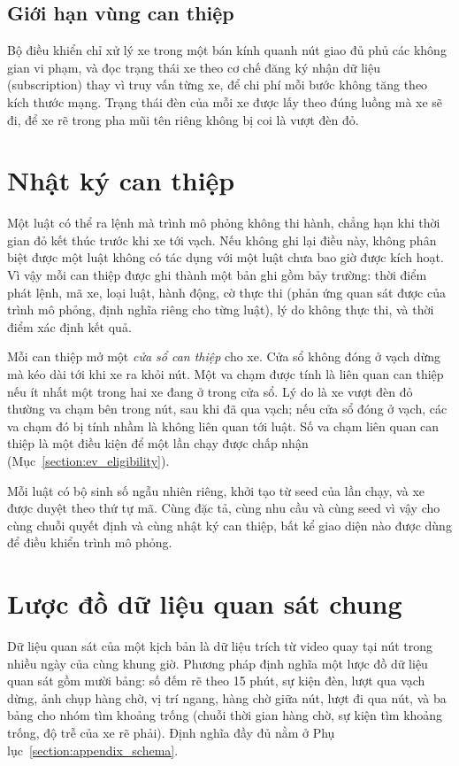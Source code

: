 \documentclass[../main.tex]{subfiles}
\begin{document}
\subsection{Giới hạn vùng can thiệp}

Bộ điều khiển chỉ xử lý xe trong một bán kính quanh nút giao đủ phủ các không gian vi phạm, và đọc trạng thái xe theo cơ chế đăng ký nhận dữ liệu (subscription) thay vì truy vấn từng xe, để chi phí mỗi bước không tăng theo kích thước mạng. Trạng thái đèn của mỗi xe được lấy theo đúng luồng mà xe sẽ đi, để xe rẽ trong pha mũi tên riêng không bị coi là vượt đèn đỏ.

\section{Nhật ký can thiệp}
\label{section:ex_log}

Một luật có thể ra lệnh mà trình mô phỏng không thi hành, chẳng hạn khi thời gian đỏ kết thúc trước khi xe tới vạch. Nếu không ghi lại điều này, không phân biệt được một luật không có tác dụng với một luật chưa bao giờ được kích hoạt. Vì vậy mỗi can thiệp được ghi thành một bản ghi gồm bảy trường: thời điểm phát lệnh, mã xe, loại luật, hành động, cờ thực thi (phản ứng quan sát được của trình mô phỏng, định nghĩa riêng cho từng luật), lý do không thực thi, và thời điểm xác định kết quả.

Mỗi can thiệp mở một \emph{cửa sổ can thiệp} cho xe. Cửa sổ không đóng ở vạch dừng mà kéo dài tới khi xe ra khỏi nút. Một va chạm được tính là liên quan can thiệp nếu ít nhất một trong hai xe đang ở trong cửa sổ. Lý do là xe vượt đèn đỏ thường va chạm bên trong nút, sau khi đã qua vạch; nếu cửa sổ đóng ở vạch, các va chạm đó bị tính nhầm là không liên quan tới luật. Số va chạm liên quan can thiệp là một điều kiện để một lần chạy được chấp nhận (Mục~\ref{section:ev_eligibility}).

Mỗi luật có bộ sinh số ngẫu nhiên riêng, khởi tạo từ seed của lần chạy, và xe được duyệt theo thứ tự mã. Cùng đặc tả, cùng nhu cầu và cùng seed vì vậy cho cùng chuỗi quyết định và cùng nhật ký can thiệp, bất kể giao diện nào được dùng để điều khiển trình mô phỏng.

\section{Lược đồ dữ liệu quan sát chung}
\label{section:ev_schema}

Dữ liệu quan sát của một kịch bản là dữ liệu trích từ video quay tại nút trong nhiều ngày của cùng khung giờ. Phương pháp định nghĩa một lược đồ dữ liệu quan sát gồm mười bảng: số đếm rẽ theo 15 phút, sự kiện đèn, lượt qua vạch dừng, ảnh chụp hàng chờ, vị trí ngang, hàng chờ giữa nút, lượt đi qua nút, và ba bảng cho nhóm tìm khoảng trống (chuỗi thời gian hàng chờ, sự kiện tìm khoảng trống, độ trễ của xe rẽ phải). Định nghĩa đầy đủ nằm ở Phụ lục~\ref{section:appendix_schema}.
\end{document}
